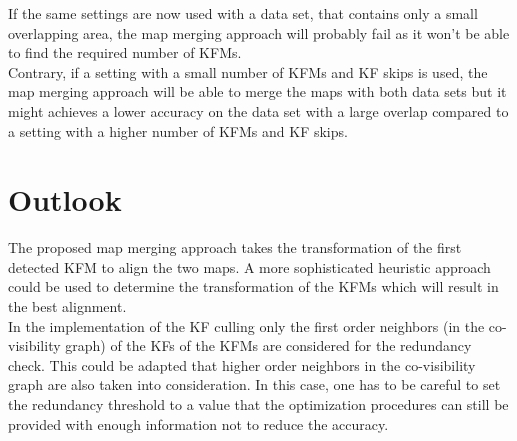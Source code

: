 If the same settings are now used with a data set, that contains only a small overlapping area, the map merging approach will probably fail as it won't be able to find the required number of \acp{KFM}.\\

Contrary, if a setting with a small number of \acp{KFM} and \ac{KF} skips is used, the map merging approach will be able to merge the maps with both data sets but it might achieves a lower accuracy on the data set with a large overlap compared to a setting with a higher number of \acp{KFM} and \ac{KF} skips.

\section{Outlook}

The proposed map merging approach takes the transformation of the first detected \ac{KFM} to align the two maps. A more sophisticated heuristic approach could be used to determine the transformation of the \acp{KFM} which will result in the best alignment.\\

In the implementation of the \ac{KF} culling only the first order neighbors (in the co-visibility graph) of the \acp{KF} of the \acp{KFM} are considered for the redundancy check. This could be adapted that higher order neighbors in the co-visibility graph are also taken into consideration. In this case, one has to be careful to set the redundancy threshold to a value that the optimization procedures can still be provided with enough information not to reduce the accuracy.
